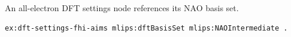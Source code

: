 An all-electron DFT settings node references its NAO basis set.
\begin{lstlisting}[language=turtle]
ex:dft-settings-fhi-aims mlips:dftBasisSet mlips:NAOIntermediate .
\end{lstlisting}
